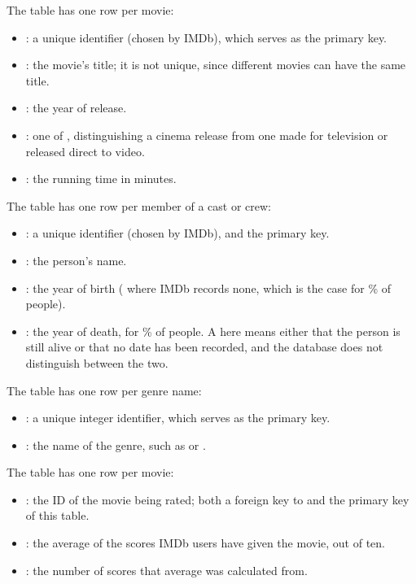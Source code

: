 \noindent The  table has one row per movie:
\begin{itemize}
    \item {}: a unique identifier (chosen by IMDb), which serves as the primary key.
    \item {}: the movie's title; it is not unique, since different movies can have the same title.
    \item {}: the year of release.
    \item {}: one of , distinguishing a cinema release from one made for television or released direct to video.
    \item {}: the running time in minutes.
\end{itemize}
The  table has one row per member of a cast or crew:
\begin{itemize}
    \item {}: a unique identifier (chosen by IMDb), and the primary key.
    \item {}: the person's name.
    \item {}: the year of birth ( where IMDb records none, which is the case for \dbnullbirthyear\% of people).
    \item {}: the year of death,  for \dbnulldeathyear\% of people.
        A  here means either that the person is still alive or that no date has been recorded, and the database does not distinguish between the two.
\end{itemize}
The  table has one row per genre name:
\begin{itemize}
    \item {}: a unique integer identifier, which serves as the primary key.
    \item {}: the name of the genre, such as  or .
\end{itemize}
The  table has one row per movie:
\begin{itemize}
    \item {}: the ID of the movie being rated; both a foreign key to  and the primary key of this table.
    \item {}: the average of the scores IMDb users have given the movie, out of ten.
    \item {}: the number of scores that average was calculated from.
\end{itemize}
